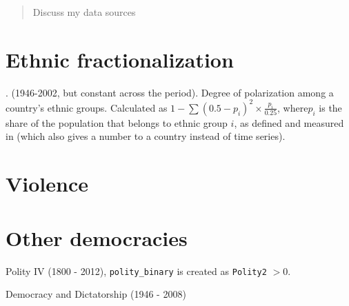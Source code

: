\documentclass[]{article}
\title{}
\author{}
\begin{document}
\maketitle

\begin{abstract}
Discuss my data sources
\end{abstract}

\section{Ethnic fractionalization}

\cite[p. 190]{Gandhi2008}. (1946-2002, but constant across the period). Degree of polarization among a country's ethnic groups. Calculated as $1 - \sum(0.5 - p_i)^2 \times \frac{p_i}{0.25}$, where$p_i$ is the share of the population that belongs to ethnic group $i$, as defined and measured in \cite{Fearon2003} (which also gives a number to a country instead of time series).

\section{Violence}

\section{Other democracies}

Polity IV (1800 - 2012), \verb`polity_binary` is created as \verb`Polity2` $> 0$.

Democracy and Dictatorship (1946 - 2008)




\end{document}
